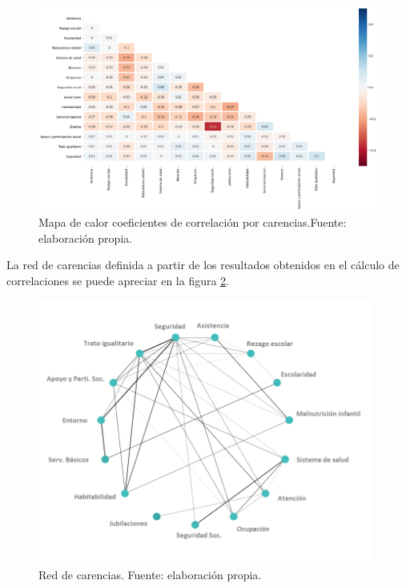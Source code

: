 \documentclass[12pt,letterpaper,spanish]{article}
\begin{document}
\begin{figure}[H]
    \centering
        \includegraphics[width=\linewidth]{Heatmaps/Heatmap_pearson_Correlaciones.png}
    \caption{Mapa de calor coeficientes de correlación por carencias.Fuente: elaboración propia.}
    \label{pearsoncarencias}
\end{figure}



La red de carencias definida a partir de los resultados obtenidos en el cálculo de correlaciones se puede apreciar en la figura \ref{grafoPos}.

\begin{figure}[H]
    \centering
        \includegraphics[width=11cm]{Grafos/GrafoCarencias.png}
    \caption{Red de carencias. Fuente: elaboración propia.}
    \label{grafoPos}
\end{figure}
\end{document}

